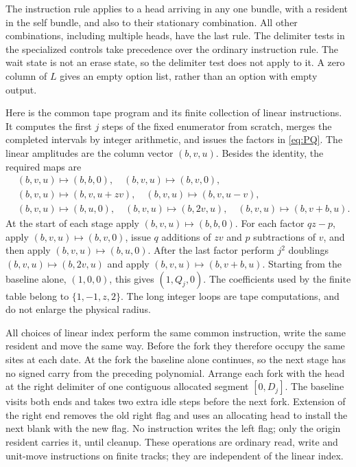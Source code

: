 The instruction rule applies to a head arriving in any one bundle, with a resident in the self bundle, and also to their stationary combination. All other combinations, including multiple heads, have the last rule. The delimiter tests in the specialized controls take precedence over the ordinary instruction rule. The wait state is not an erase state, so the delimiter test does not apply to it. A zero column of \(L\) gives an empty option list, rather than an option with empty output.

Here is the common tape program and its finite collection of linear instructions. It computes the first \(j\) steps of the fixed enumerator from scratch, merges the completed intervals by integer arithmetic, and issues the factors in \eqref{eq:PQ}. The linear amplitudes are the column vector \((b,v,u)\). Besides the identity, the required maps are
\begin{equation}\label{eq:linear-instructions}
\begin{split}
 &(b,v,u)\mapsto(b,b,0),\quad (b,v,u)\mapsto(b,v,0),\\
 &(b,v,u)\mapsto(b,v,u+zv),\quad
 (b,v,u)\mapsto(b,v,u-v),\\
 &(b,v,u)\mapsto(b,u,0),\quad
 (b,v,u)\mapsto(b,2v,u),\quad
 (b,v,u)\mapsto(b,v+b,u).
\end{split}
\end{equation}
At the start of each stage apply \((b,v,u)\mapsto(b,b,0)\). For each factor \(qz-p\), apply \((b,v,u)\mapsto(b,v,0)\), issue \(q\) additions of \(zv\) and \(p\) subtractions of \(v\), and then apply \((b,v,u)\mapsto(b,u,0)\). After the last factor perform \(j^2\) doublings \((b,v,u)\mapsto(b,2v,u)\) and apply \((b,v,u)\mapsto(b,v+b,u)\). Starting from the baseline alone, \((1,0,0)\), this gives \((1,Q_j,0)\). The coefficients used by the finite table belong to \(\{1,-1,z,2\}\). The long integer loops are tape computations, and do not enlarge the physical radius.

All choices of linear index perform the same common instruction, write the same resident and move the same way. Before the fork they therefore occupy the same sites at each date. At the fork the baseline alone continues, so the next stage has no signed carry from the preceding polynomial. Arrange each fork with the head at the right delimiter of one contiguous allocated segment \([0,D_j]\). The baseline visits both ends and takes two extra idle steps before the next fork. Extension of the right end removes the old right flag and uses an allocating head to install the next blank with the new flag. No instruction writes the left flag; only the origin resident carries it, until cleanup. These operations are ordinary read, write and unit-move instructions on finite tracks; they are independent of the linear index.

